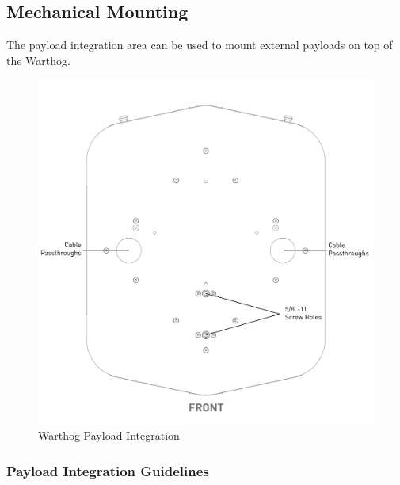 \documentclass[]{clearpath-latex/clearpath-manual}
\begin{document}
\pagebreak[4]
\subsection{Mechanical Mounting}
\label{mechanical}

The payload integration area can be used to mount external payloads on top of the Warthog.

\begin{figure}[!hbt]
  \centering
  \includegraphics[width=0.75\linewidth]{Payload_Integration_Plate.pdf}
  \caption{Warthog Payload Integration}
  \label{payloadplate}
\end{figure}

\subsubsection{Payload Integration Guidelines}
\end{document}

